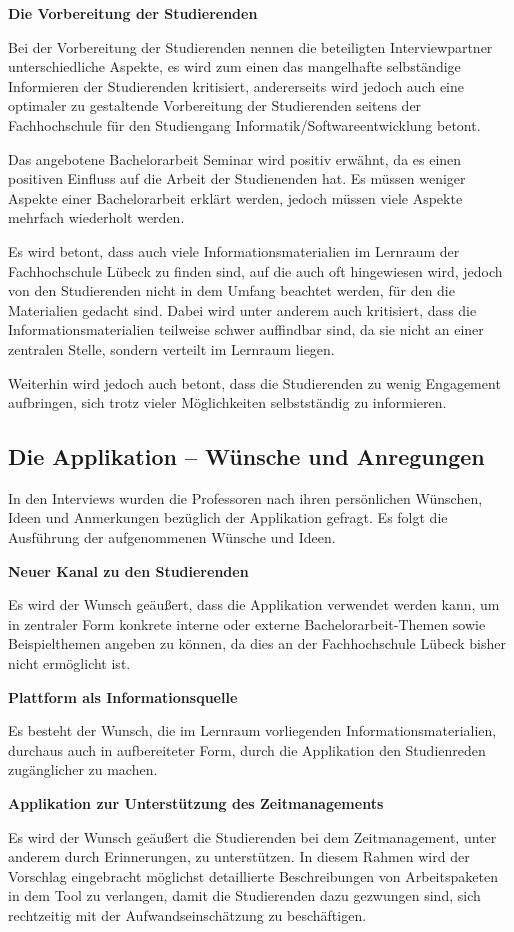 \documentclass[bibliography=totoc,listof=totoc,BCOR=5mm,DIV=12,oneside]{scrbook}
\begin{document}
\newpage
\par \bigskip \textbf{Die Vorbereitung der Studierenden}
\par Bei der Vorbereitung der Studierenden nennen die beteiligten Interviewpartner unterschiedliche Aspekte, es wird zum einen das mangelhafte selbständige Informieren der Studierenden kritisiert, andererseits wird jedoch auch eine optimaler zu gestaltende Vorbereitung der Studierenden seitens der Fachhochschule für den Studiengang Informatik/Softwareentwicklung betont.
\par \medskip Das angebotene Bachelorarbeit Seminar wird positiv erwähnt, da es einen positiven Einfluss auf die Arbeit der Studienenden hat. Es müssen weniger Aspekte einer Bachelorarbeit erklärt werden, jedoch müssen viele Aspekte mehrfach wiederholt werden. 
\par Es wird betont, dass auch viele Informationsmaterialien im Lernraum der Fachhochschule Lübeck zu finden sind, auf die auch oft hingewiesen wird, jedoch von den Studierenden nicht in dem Umfang beachtet werden, für den die Materialien gedacht sind. Dabei wird unter anderem auch kritisiert, dass die Informationsmaterialien teilweise schwer auffindbar sind, da sie nicht an einer zentralen Stelle, sondern verteilt im Lernraum liegen. 
\par Weiterhin wird jedoch auch betont, dass die Studierenden zu wenig Engagement aufbringen, sich trotz vieler Möglichkeiten selbstständig zu informieren. 

\subsection{Die Applikation – Wünsche und Anregungen}
\par In den Interviews wurden die Professoren nach ihren persönlichen Wünschen, Ideen und Anmerkungen bezüglich der Applikation gefragt. Es folgt die Ausführung der aufgenommenen Wünsche und Ideen.

\par \bigskip \textbf{Neuer Kanal zu den Studierenden}
\par Es wird der Wunsch geäußert, dass die Applikation verwendet werden kann, um in zentraler Form konkrete interne oder externe Bachelorarbeit-Themen sowie Beispielthemen angeben zu können, da dies an der Fachhochschule Lübeck bisher nicht ermöglicht ist.
\par \bigskip \textbf{Plattform als Informationsquelle}
\par Es besteht der Wunsch, die im Lernraum vorliegenden Informationsmaterialien, durchaus auch in aufbereiteter Form, durch die Applikation den Studienreden zugänglicher zu machen.
\par \bigskip \textbf{Applikation zur Unterstützung des Zeitmanagements}
\par Es wird der Wunsch geäußert die Studierenden bei dem Zeitmanagement, unter anderem durch Erinnerungen, zu unterstützen. In diesem Rahmen wird der Vorschlag eingebracht möglichst detaillierte Beschreibungen von Arbeitspaketen in dem Tool zu verlangen, damit die Studierenden dazu gezwungen sind, sich rechtzeitig mit der Aufwandseinschätzung zu beschäftigen.
\end{document}
